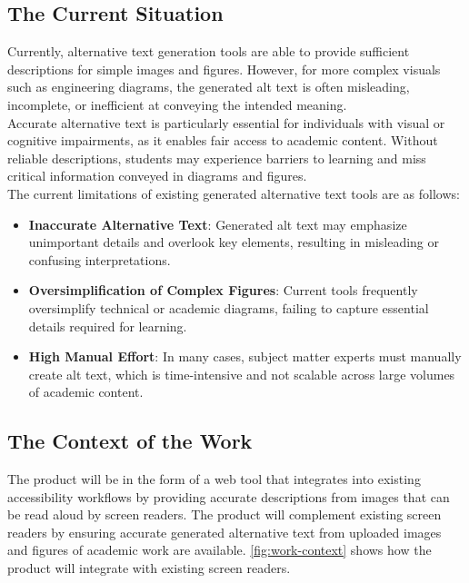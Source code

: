 \documentclass[12pt]{article}
\begin{document}
\subsection{The Current Situation}
Currently, alternative text generation tools are able to provide
sufficient descriptions for simple images and figures. However, for
more complex visuals
such as engineering diagrams, the generated alt text is often
misleading, incomplete, or inefficient at conveying the intended meaning.\\
Accurate alternative text is particularly essential for individuals
with visual or cognitive impairments, as it enables fair access to
academic content. Without
reliable descriptions, students may experience barriers to learning
and miss critical information conveyed in diagrams and figures.\\
The current limitations of existing generated alternative text tools
are as follows:
\begin{itemize}
  \item \textbf{Inaccurate Alternative Text}: Generated alt text may
    emphasize unimportant details and overlook key elements,
    resulting in misleading or confusing interpretations.
  \item \textbf{Oversimplification of Complex Figures}: Current tools
    frequently oversimplify technical or academic diagrams,
    failing to capture essential details required for learning.
  \item \textbf{High Manual Effort}: In many cases, subject matter
    experts must manually create alt text,
    which is time-intensive and not scalable across large volumes of
    academic content.
\end{itemize}

\subsection{The Context of the Work}
The product will be in the form of a web tool that integrates into
existing accessibility workflows
by providing accurate descriptions from images that can be read aloud
by screen readers. The product
will complement existing screen readers by ensuring accurate
generated alternative text from
uploaded images and figures of academic work are available.
\autoref{fig:work-context} shows
how the product will integrate with existing screen readers.
\end{document}
